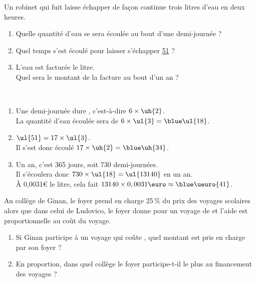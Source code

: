 \begin{colonne*exercice}
\bigskip


\begin{exercice} %
   Un robinet qui fuit laisse échapper de façon continue trois litres d’eau en deux heures.
   \begin{enumerate}
      \item Quelle quantité d’eau se sera écoulée au bout d’une demi-journée ?
      \item Quel temps s’est écoulé pour laisser s’échapper \ul{51} ?
      \item L’eau est facturée  le litre. \\
         Quel sera le montant de la facture au bout d’un an ?
   \end{enumerate}
\end{exercice}

\begin{corrige}
   \ \\ [-5mm]
   \begin{enumerate}
      \item Une demi-journée dure , c'est-à-dire $6\times\uh{2}$. \\
         La quantité d'eau écoulée sera de $6\times\ul{3} =\blue \ul{18}$.
      \item $\ul{51} =17\times\ul{3}$. \\
         Il s'est donc écoulé $17\times\uh{2} =\blue \uh{34}$.
      \item Un an, c'est 365 jours, soit 730 demi-journées. \\
         Il s'écoulera donc $730\times\ul{18} =\ul{13140}$ en un an. \\
         À 0,0031\euro{} le litre, cela fait $13140\times0,0031\text{\euro} \approx\blue \ueuro{41}$.
   \end{enumerate}
\end{corrige}

\bigskip


\begin{exercice} %
   Au collège de Ginan, le foyer prend en charge 25\,\% du prix des voyages scolaires alors que dans celui de Ludovico, le foyer donne  pour un voyage de  et l'aide est proportionnelle au coût du voyage.
   \begin{enumerate}
      \item Si Ginan participe à un voyage qui coûte , quel montant est pris en charge par son foyer ?
      \item En proportion, dans quel collège le foyer participe-t-il le plus au financement des voyages ?
   \end{enumerate}
\end{exercice}


\end{colonne*exercice}
